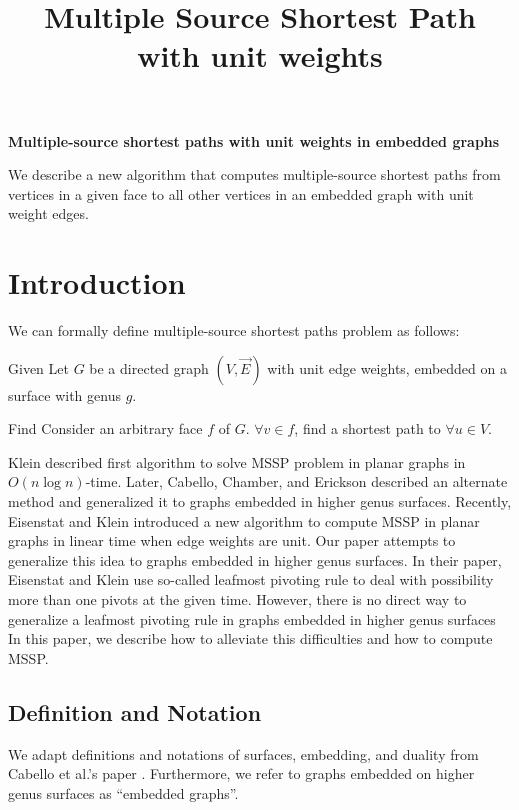 \documentclass{article}
\begin{document}
\title{Multiple Source Shortest Path with unit weights}

\begin{center}
\textbf{\large Multiple-source shortest paths with unit weights in embedded
graphs}
\end{center}

\DRAFT

\begin{bigabstract}
We describe a new algorithm that computes multiple-source shortest paths from
vertices in a given face to all other vertices in an embedded graph
with unit weight edges.
\end{bigabstract}

\section{Introduction}

We can formally define multiple-source shortest paths problem as follows: 

\begin{oneshot}{Given}
Let $G$ be a directed graph $(V, \vec{E})$ with unit edge weights, embedded on a surface with genus $g$.
\end{oneshot}

\begin{oneshot}{Find}
Consider an arbitrary face $f$ of $G$. $\forall v \in f$, find a shortest path to
$\forall u \in V$.
\end{oneshot}

Klein \cite{klein2005multiple} described first algorithm to solve MSSP problem in planar graphs in $O(n \log{n})$-time. Later, Cabello, Chamber, and Erickson \cite{cabello2013multiple} described an alternate method and generalized it to graphs embedded in higher genus surfaces. 
Recently, Eisenstat and Klein \cite{eisenstat2013linear} introduced a new algorithm to compute MSSP in planar graphs in linear time when edge weights are unit. Our 
paper attempts to generalize this idea to graphs embedded in higher genus surfaces. In their paper, Eisenstat and Klein use so-called leafmost pivoting rule to deal with possibility more than one pivots at the given time. However, there is no direct way 
to generalize a leafmost pivoting rule in graphs embedded in higher genus surfaces 
In this paper, we describe how to alleviate this difficulties and how to compute MSSP. 

\subsection{Definition and Notation}
We adapt definitions and notations of surfaces, embedding, and duality from Cabello et al.'s paper \cite{cabello2013multiple}. Furthermore, we refer to graphs embedded on higher genus surfaces as ``embedded graphs''.
\end{document}
